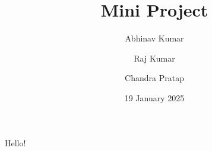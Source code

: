 \documentclass{report}
\title{Mini Project}
\date{19 January 2025}
\author{
	Abhinav Kumar
	\and
	Raj Kumar
	\and
	Chandra Pratap
}
\begin{document}
	\maketitle
	Hello!
\end{document}
